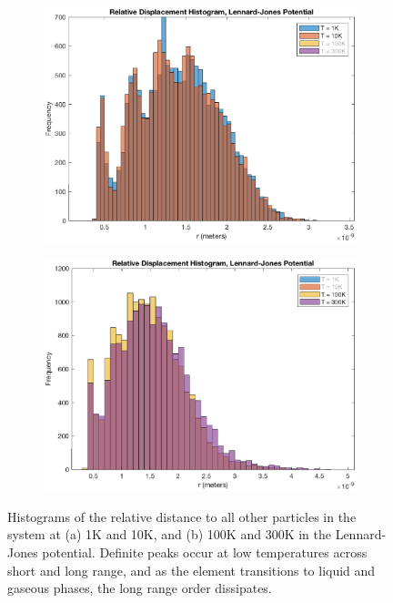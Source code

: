 \documentclass[12pt]{article}
\begin{document}
\begin{figure}[!h]
\begin{subfigure}{0.5\textwidth}
\includegraphics[width=0.9\linewidth]{./finalpics/LJfinalrelativer.eps}
\caption{\label{LJrel}}
\end{subfigure}
\begin{subfigure}{0.5\textwidth}
\includegraphics[width=0.9\linewidth]{./finalpics/LJfinalrelativerhighT.eps}
\caption{\label{LJrelhigh}}
\end{subfigure}
\caption{Histograms of the relative distance to all other particles in the system at (a) 1K and 10K, and (b) 100K and 300K in the Lennard-Jones potential.  Definite peaks occur at low temperatures across short and long range, and as the element transitions to liquid and gaseous phases, the long range order dissipates.} 
\end{figure}
\end{document}
